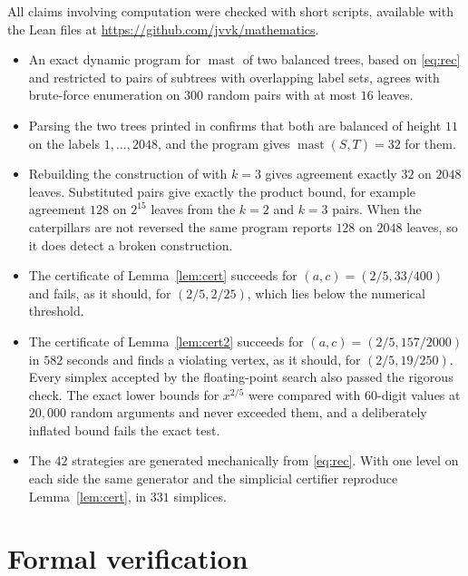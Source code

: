 \documentclass[11pt]{amsart}
\theoremstyle{definition}
\newcommand{\mast}{\operatorname{mast}}
\begin{document}
All claims involving computation were checked with short scripts, available with the Lean files at
\url{https://github.com/jvvk/mathematics}.
\begin{itemize}
\item An exact dynamic program for $\mast$ of two balanced trees, based on \eqref{eq:rec} and
  restricted to pairs of subtrees with overlapping label sets, agrees with brute-force
  enumeration on $300$ random pairs with at most $16$ leaves.
\item Parsing the two trees printed in \cite[Appendix~A]{BLOSSW} confirms that both are balanced of
  height $11$ on the labels $1,\dots,2048$, and the program gives $\mast(S,T)=32$ for them.
\item Rebuilding the construction of \cite[Theorem~4.6]{BLOSSW} with $k=3$ gives agreement
  exactly $32$ on $2048$ leaves. Substituted pairs give exactly the product bound, for example
  agreement $128$ on $2^{15}$ leaves from the $k=2$ and $k=3$ pairs. When the caterpillars are
  not reversed the same program reports $128$ on $2048$ leaves, so it does detect a broken
  construction.
\item The certificate of Lemma~\ref{lem:cert} succeeds for $(a,c)=(2/5,33/400)$ and fails, as it
  should, for $(2/5,2/25)$, which lies below the numerical threshold.
\item The certificate of Lemma~\ref{lem:cert2} succeeds for $(a,c)=(2/5,157/2000)$ in $582$ seconds and
  finds a violating vertex, as it should, for $(2/5,19/250)$. Every simplex accepted by the
  floating-point search also passed the rigorous check. The exact lower bounds for $x^{2/5}$ were
  compared with $60$-digit values at $20{,}000$ random arguments and never exceeded them, and a
  deliberately inflated bound fails the exact test.
\item The $42$ strategies are generated mechanically from \eqref{eq:rec}. With one level on each side
  the same generator and the simplicial certifier reproduce Lemma~\ref{lem:cert}, in $331$ simplices.
\end{itemize}

\section{Formal verification}\label{sec:lean}
\end{document}
